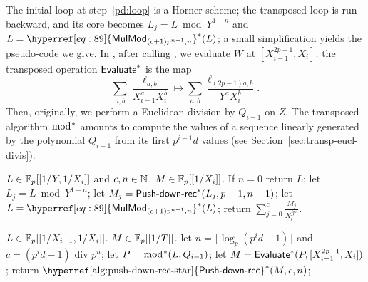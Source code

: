 The initial loop at step~\ref{pd:loop} is a Horner scheme; the
transposed loop is run backward, and its core becomes $L_j=L\bmod
Y^{1-n}$ and
$L=\dual{\hyperref[eq:89]{\alg{MulMod}_{(c+1)p^{n-1},n}}}(L)$; a small
simplification yields the pseudo-code we give.  In \hyperref[alg:push-down]{},
after calling \hyperref[alg:push-down-rec]{}, we evaluate $W$ at
$[X_{i-1}^{2p-1},X_i]$: the transposed operation ${{\sf Evaluate}}^\ast$ is the map
\begin{equation}
  \label{eq:83}
  \sum_{a,b} \frac{\ell_{a,b}}{X_{i-1}^a X_i^b} \mapsto
  \sum_{a,b} \frac{\ell_{(2p-1)a,b}}{Y^a X_i^b}
  \text{.} 
\end{equation}
Then, originally, we perform a Euclidean division by $Q_{i-1}$ on
$Z$. The transposed algorithm
$\bmod^\ast$ amounts to compute the values of a sequence linearly
generated by the polynomial $Q_{i-1}$ from its first $p^{i-1}d$ values
(see Section~\ref{sec:transp-eucl-divis}).

\begin{algorithm}
  \caption{\label{alg:push-down-rec-star}$\dual{\text{\alg{Push-down-rec}}}$}
  \begin{algorithmic}[1]
    \REQUIRE $L\in\mathbb{F}_p[[1/Y,1/X_i]]$ and $c,n\in\mathbb{N}$.
    \ENSURE $M\in \mathbb{F}_p[[1/X_i]]$.
    \STATE If $n=0$ return $L$;
    \STATE let $L_j = L \bmod Y^{1-n}$;
    \STATE let $M_j=\text{{\sf Push-down-rec}}^\ast(L_j,p-1,n-1)$;
    \STATE let $L = \dual{\hyperref[eq:89]{\alg{MulMod}_{(c+1)p^{n-1},n}}}(L)$;
    \ENDFOR
    \STATE return $\sum_{j=0}^{c} \frac{M_j}{X_i^{jp^n}}$.
  \end{algorithmic}
\end{algorithm}

\begin{algorithm}
  \caption{\label{alg:push-down-star}$\dual{\text{\alg{Push-down}}}$}
  \begin{algorithmic}[1]
    \REQUIRE $L\in \mathbb{F}_p[[1/X_{i-1},1/X_i]]$.
    \ENSURE $M \in \mathbb{F}_p[[1/T]]$.
    \STATE let $n=\lfloor \log_p(p^id-1) \rfloor$ and $c=(p^id-1) \text{ div } p^n$;
    \STATE let $P=\bmod^\ast(L,Q_{i-1})$;
    \STATE let $M = {\sf Evaluate}^\ast(P,[X_{i-1}^{2p-1},X_i])$;
    \STATE return $\dual{\text{\hyperref[alg:push-down-rec-star]{\alg{Push-down-rec}}}}(M,c,n)$;
  \end{algorithmic}
\end{algorithm}



